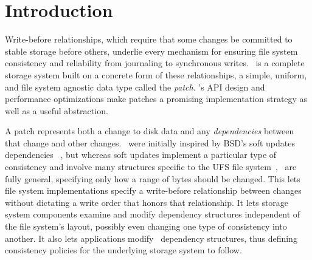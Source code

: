 
\section {Introduction}
\label{sec:intro}

\begin{comment}
This paper aims to evaluate whether a simple, unified abstraction that
represents all modifications to stable storage, including
\emph{dependencies} among modifications, can be used to efficiently
implement a complete file system layer, where modifications are common
and cache sizes are large.
%
The answer is a qualified yes.
\end{comment}


Write-before relationships, which require that some changes be committed
 to stable storage before others, underlie every mechanism for ensuring file system
 consistency and reliability from journaling to synchronous writes.
%
\Featherstitch\ is a complete storage system
 built on a concrete form of these relationships,
 a simple, uniform, and file system agnostic data type called the \emph{patch}.
%
\Kudos's API design and performance optimizations make patches
 a promising implementation strategy as well as a useful abstraction.


\begin{comment}
As file system functionality increases, maintaining file system
 correctness in the presence of failures is increasingly a focus of
 research~\cite{sivathanuetal05-logic,denehyetal05-journal-guided}.
%
File systems today deal with many challenges that make implementing this
 property difficult: power losses, software failures, and even user
 intervention all pose significant threats.
%
To meet this challenge, file systems use a variety of techniques, like
 journaling and soft updates.
%
These mechanisms are each based on imposing some write-before
 relationship among buffered changes to the data in stable storage.
%
The answer is a qualified yes.
\end{comment}


A patch represents both a change to disk data and any \emph{dependencies}
 between that change and other changes. 
%
\Patches\ were initially inspired by BSD's soft updates dependencies%
~\cite{ganger00soft}, but whereas soft updates
 implement a particular type of consistency
 and involve many structures specific to the UFS file
 system~\cite{mckusick99soft}, \patches\ are fully general,
 specifying only how a range of bytes should be changed.
%
This lets file system implementations specify a
 write-before relationship between changes without dictating
 a write order that honors that relationship.
%
It lets storage system components examine and
 modify dependency structures independent of the file system's layout,
 possibly even changing one type of consistency into another.
%
It also lets applications modify \patch\ dependency structures,
 thus defining consistency policies for the underlying
 storage system to follow.


